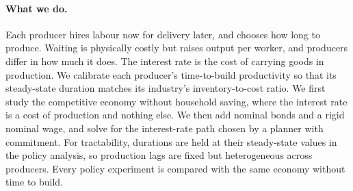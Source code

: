 \documentclass[11pt]{article}
\theoremstyle{definition}
\begin{document}
\paragraph{What we do.}
Each producer hires labour now for delivery later, and chooses how long to produce. Waiting is
physically costly but raises output per worker, and producers differ in how much it does. The
interest rate is the cost of carrying goods in production. We calibrate each producer's
time-to-build productivity so that its steady-state duration matches its industry's
inventory-to-cost ratio. We first study the competitive economy without household saving, where
the interest rate is a cost of production and nothing else. We then add nominal bonds and a rigid
nominal wage, and solve for the interest-rate path chosen by a planner with commitment. For
tractability, durations are held at their steady-state values in the policy analysis, so
production lags are fixed but heterogeneous across producers. Every policy experiment is compared
with the same economy without time to build.
\end{document}
